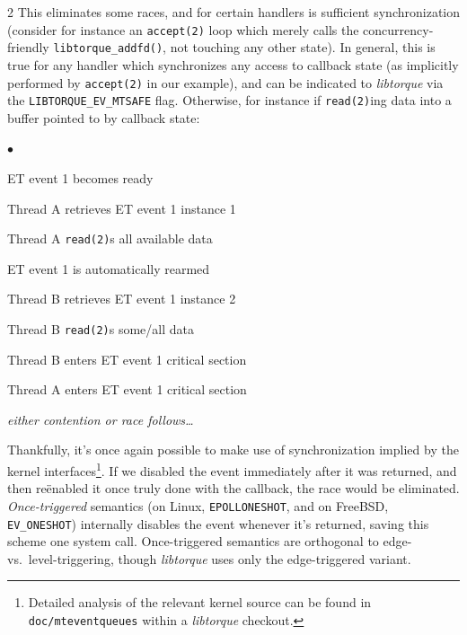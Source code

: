 \documentclass[letterpaper,10pt]{article}
\newcommand{\squishlist}{\begin{list}{$\bullet$}
  {\setlength{\itemsep}{0pt}
    \setlength{\parsep}{3pt}
    \setlength{\topsep}{3pt}
    \setlength{\partopsep}{0pt}
    \setlength{\leftmargin}{1.5em}
    \setlength{\labelwidth}{1em}
    \setlength{\labelsep}{0.5em}}}
\newcommand{\squishend}{\end{list}}
\begin{document}
\begin{multicols}{2}
This eliminates some races, and for certain handlers is sufficient synchronization
(consider for instance an \texttt{accept(2)} loop which merely calls
the concurrency-friendly \texttt{libtorque\_addfd()}, not touching any other
state). In general, this is true for any handler which synchronizes any
access to callback state (as implicitly performed by \texttt{accept(2)} in our
example), and can be indicated to \textit{libtorque} via the \texttt{LIBTORQUE\_EV\_MTSAFE}
flag. Otherwise, for instance if \texttt{read(2)}ing data into a buffer pointed to by callback
state:
\squishlist
\item ET event 1 becomes ready
\item Thread A retrieves ET event 1 instance 1
\item Thread A \texttt{read(2)}s all available data
\item ET event 1 is automatically rearmed
\item Thread B retrieves ET event 1 instance 2
\item Thread B \texttt{read(2)}s some/all data
\item Thread B enters ET event 1 critical section
\item Thread A enters ET event 1 critical section
\item \textit{either contention or race follows\ldots}
\squishend
Thankfully, it's once again possible to make use of synchronization
implied by the kernel interfaces\footnote{Detailed analysis of the relevant kernel
source can be found in \texttt{doc/mteventqueues} within a \textit{libtorque} checkout.}.
If we disabled the event immediately after it was returned, and then re\"enabled
it once truly done with the callback, the race would be eliminated. \textit{Once-triggered}
semantics (on Linux, \texttt{EPOLLONESHOT}, and on FreeBSD, \texttt{EV\_ONESHOT})
internally disables the event whenever it's returned, saving this scheme one
system call. Once-triggered semantics are orthogonal to edge- vs.\ level-triggering,
though \textit{libtorque} uses only the edge-triggered variant.

\end{multicols}
\end{document}
